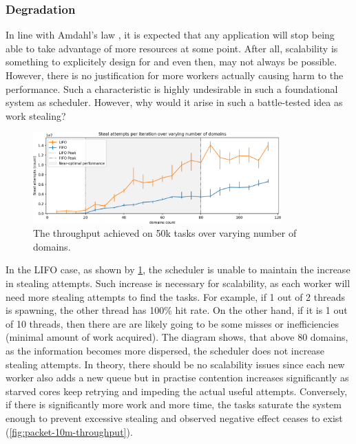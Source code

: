 \documentclass[12pt,a4paper,twoside]{report}
\begin{document}
\subsubsection{Degradation}
\label{section:degradation}
In line with Amdahl's law \cite{amdahl}, it is expected that any application will stop being able to take advantage of more resources at some point. After all, scalability is something to explicitely design for and even then, may not always be possible. However, there is no justification for more workers actually causing harm to the performance. Such a characteristic is highly undesirable in such a foundational system as scheduler. However, why would it arise in such a battle-tested idea as work stealing? 

\begin{figure} 
     \centering
     \includegraphics[width=0.85\textwidth]{eval/packet-basic-with-steal-counts2.png}
     \caption{The throughput achieved on 50k tasks over varying number of domains.}
    \label{fig:packet-with-steal-counts}
\end{figure}

In the LIFO case, as shown by \ref{fig:packet-with-steal-counts}, the scheduler is unable to maintain the increase in stealing attempts. Such increase is necessary for scalability, as each worker will need more stealing attempts to find the tasks. For example, if 1 out of 2 threads is spawning, the other thread has 100\% hit rate. On the other hand, if it is 1 out of 10 threads, then there are are likely going to be some misses or inefficiencies (minimal amount of work acquired). The diagram shows, that above 80 domains, as the information becomes more dispersed, the scheduler does not increase stealing attempts. In theory, there should be no scalability issues since each new worker also adds a new queue but in practise contention increases significantly as starved cores keep retrying and impeding the actual useful attempts. Conversely, if there is significantly more work and more time, the tasks saturate the system enough to prevent excessive stealing and observed negative effect ceases to exist (\ref{fig:packet-10m-throughput}).
\end{document}
